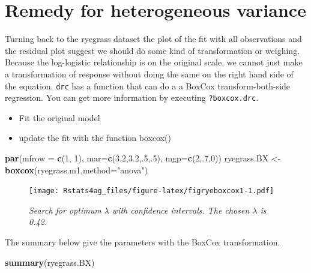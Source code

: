 \documentclass[letterpaper,]{book}
\newenvironment{Shaded}{\begin{snugshade}}{\end{snugshade}}
\newcommand{\DataTypeTok}[1]{\textcolor[rgb]{0.13,0.29,0.53}{#1}}
\newcommand{\DecValTok}[1]{\textcolor[rgb]{0.00,0.00,0.81}{#1}}
\newcommand{\FloatTok}[1]{\textcolor[rgb]{0.00,0.00,0.81}{#1}}
\newcommand{\KeywordTok}[1]{\textcolor[rgb]{0.13,0.29,0.53}{\textbf{#1}}}
\newcommand{\NormalTok}[1]{#1}
\newcommand{\StringTok}[1]{\textcolor[rgb]{0.31,0.60,0.02}{#1}}
\providecommand{\tightlist}{%
  \setlength{\itemsep}{0pt}\setlength{\parskip}{0pt}}
\begin{document}
\hypertarget{remedy-for-heterogeneous-variance}{%
\section{Remedy for heterogeneous variance}\label{remedy-for-heterogeneous-variance}}

Turning back to the ryegrass dataset the plot of the fit with all observations and the residual plot suggest we should do some kind of transformation or weighing. Because the log-logistic relationship is on the original scale, we cannot just make a transformation of response without doing the same on the right hand side of the equation. \texttt{drc} has a function that can do a a BoxCox transform-both-side regression. You can get more information by executing \texttt{?boxcox.drc}.

\begin{itemize}
\tightlist
\item
  Fit the original model
\item
  update the fit with the function boxcox()
\end{itemize}



\begin{Shaded}
\begin{Highlighting}[]
\KeywordTok{par}\NormalTok{(}\DataTypeTok{mfrow =} \KeywordTok{c}\NormalTok{(}\DecValTok{1}\NormalTok{, }\DecValTok{1}\NormalTok{), }\DataTypeTok{mar=}\KeywordTok{c}\NormalTok{(}\FloatTok{3.2}\NormalTok{,}\FloatTok{3.2}\NormalTok{,.}\DecValTok{5}\NormalTok{,.}\DecValTok{5}\NormalTok{), }\DataTypeTok{mgp=}\KeywordTok{c}\NormalTok{(}\DecValTok{2}\NormalTok{,.}\DecValTok{7}\NormalTok{,}\DecValTok{0}\NormalTok{))}
\NormalTok{ryegrass.BX <-}\StringTok{ }\KeywordTok{boxcox}\NormalTok{(ryegrass.m1,}\DataTypeTok{method=}\StringTok{"anova"}\NormalTok{)}
\end{Highlighting}
\end{Shaded}

\begin{figure}
\centering
\texttt{[image: Rstats4ag\_files/figure-latex/figryeboxcox1-1.pdf]}
\caption{\label{fig:figryeboxcox1}\emph{Search for optimum \(\lambda\) with confidence intervals. The chosen \(\lambda\) is 0.42.}}
\end{figure}

The summary below give the parameters with the BoxCox transformation.

\begin{Shaded}
\begin{Highlighting}[]
\KeywordTok{summary}\NormalTok{(ryegrass.BX)}
\end{Highlighting}
\end{Shaded}
\end{document}
